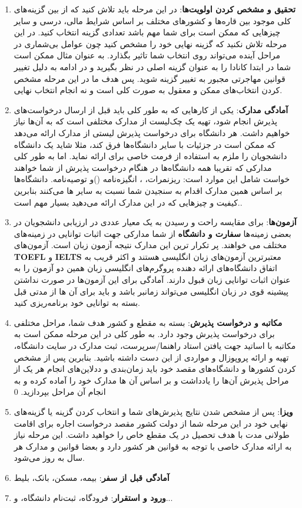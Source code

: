 \begin{enumerate}
  \item \textbf{تحقیق و مشخص کردن اولویت‌ها}: در این مرحله باید تلاش کنید که از بین گزینه‌های کلی موجود بین قاره‌ها و کشور‌های مختلف
  بر اساس شرایط مالی، درسی و سایر چیزهایی که ممکن است برای شما مهم باشد تعدادی گزینه انتخاب کنید. در این مرحله 
  تلاش نکنید که گزینه نهایی خود را مشخص کنید چون عوامل بی‌شماری در مراحل آینده می‌تواند روی انتخاب شما تاثیر بگذارد. به عنوان مثال ممکن است شما 
  در ابتدا کانادا را به عنوان گزینه اصلی در نظر بگیرید و در ادامه به دلیل تغییر قوانین مهاجرتی مجبور به تغییر گزینه شوید. پس هدف ما در
  این مرحله مشخص کردن انتخاب‌های ممکن و معقول به صورت کلی است و نه انجام انتخاب نهایی.
  \item \textbf{آمادگی مدارک}: یکی از کارهایی که به طور کلی باید قبل از ارسال درخواست‌های پذیرش انجام شود، تهیه یک چک‌لیست از مدارک مختلفی
  است که به آن‌ها نیاز خواهیم داشت. هر دانشگاه برای درخواست پذیرش لیستی از مدارک ارائه می‌دهد که ممکن است در جزئیات با سایر دانشگاه‌ها فرق کند، 
  مثلا شاید یک دانشگاه دانشجویان را ملزم به استفاده از فرمت خاصی برای ارائه  نماید. اما به طور کلی مدارکی که تقریبا همه دانشگاه‌ها 
  در هنگام درخواست پذیرش از شما خواهند خواست شامل این موارد است: ریزنمرات، ، انگیزه‌نامه ()و توصیه‌نامه.
  دانشگاه‌ها بر اساس همین مدارک اقدام به سنجیدن شما نسبت به سایر  ها می‌کنند بنابرین کیفیت و چیزهایی که در این مدارک ارائه 
  می‌دهید بسیار مهم است..
  \item \textbf{آزمون‌ها}: برای مقایسه راحت و رسیدن به یک معیار عددی در ارزیابی دانشجویان در بعضی زمینه‌ها \textbf{سفارت و دانشگاه} از 
  شما مدارکی جهت اثبات توانایی در زمینه‌های مختلف می خواهند. پر تکرار ترین این مدارک نتیجه آزمون زبان است. آزمون‌های \textbf{TOEFL} و \textbf{IELTS}
  معتبرترین آزمون‌های زبان انگلیسی هستند و اکثر قریب به اتفاق دانشگاه‌های ارائه دهنده پروگرم‌های انگلیسی زبان همین دو آزمون را به عنوان اثبات توانایی زبان قبول دارند. 
  آمادگی برای این آزمون‌ها در صورت نداشتن پیشینه قوی در زبان انگلیسی می‌تواند زمانبر باشد و باید برای آن ها از مدتی قبل بسته به توانایی خود برنامه‌ریزی کنید.
  \item \textbf{مکاتبه و درخواست پذیرش}: بسته به مقطع و کشور هدف شما، مراحل مختلفی برای درخواست پذیرش وجود دارد. به طور کلی در این مرحله ممکن است به مکاتبه با 
  اساتید جهت یافتن استاد راهنما/سرپرست، ثبت مدارک در سایت دانشگاه، تهیه و ارائه پروپوزال و مواردی از این دست داشته باشید. بنابرین پس از مشخص کردن کشور‌ها و دانشگاه‌های 
  مقصد خود باید زمان‌بندی و ددلاین‌های انجام هر یک از مراحل پذیرش آن‌ها را یادداشت و بر اساس آن ها مدارک خود را آماده کرده و به انجام آن مراحل بپردازید. 0
  \item \textbf{ویزا}: پس از مشخص شدن نتایج پذیرش‌های شما و انتخاب کردن گزینه‌ یا گزینه‌های نهایی خود در این مرحله شما از دولت کشور 
  مقصد درخواست اجاره برای اقامت طولانی مدت با هدف تحصیل در یک مقطع خاص را خواهید داشت. این مرحله نیاز به ارائه مدارک خاصی با توجه 
  به قوانین هر کشور دارد و بعضا قوانین و مدارک هر سال به روز می‌شود.
  \item \textbf{آمادگی قبل از سفر}: بیمه، مسکن، بانک، بلیط
  \item \textbf{ورود و استقرار}: فرودگاه، ثبت‌نام دانشگاه،  و...
\end{enumerate}

